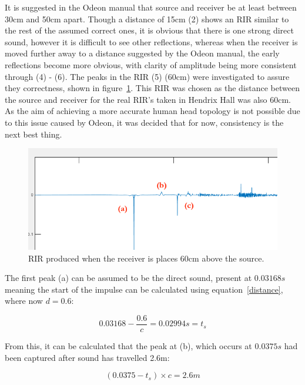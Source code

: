 \documentclass[../../main.tex]{subfiles}
\begin{document}
			It is suggested in the Odeon manual that source and receiver be at least between 30cm and 50cm apart. Though a distance of 15cm (2) shows an \ac{RIR} similar to the rest of the assumed correct ones, it is obvious that there is one strong direct sound, however it is difficult to see other reflections, whereas when the receiver is moved further away to a distance suggested by the Odeon manual, the early reflections become more obvious, with clarity of amplitude being more consistent through (4) - (6). The peaks in the RIR (5) (60cm) were investigated to assure they correctness, shown in figure~\ref{60cm}. This \ac{RIR} was chosen as the distance between the source and receiver for the real RIR’s taken in Hendrix Hall was also 60cm. As the aim of achieving a more accurate human head topology is not possible due to this issue caused by Odeon, it was decided that for now, consistency is the next best thing.

			\begin{figure}[H]
				\center\includegraphics[scale = 0.6]{Sections/Implementation/Odeon/images/incorrectRIR/76_60cm_editV2_crop.png}
				\caption{\ac{RIR} produced when the receiver is places 60cm above the source.}
				\label{60cm}
			\end{figure}

			The first peak (a) can be assumed to be the direct sound, present at $0.03168s$ meaning the start of the impulse can be calculated using equation~\ref{distance}, where now $d = 0.6$:

			\begin{equation}
			0.03168 - \frac{0.6}{c} = 0.02994s = t_s
			\end{equation}

			From this, it can be calculated that the peak at (b), which occurs at $0.0375s$ had been captured after sound has travelled 2.6m:

			\begin{equation}
			(0.0375 - t_s)\times{c} = 2.6m
			\end{equation}
\end{document}
